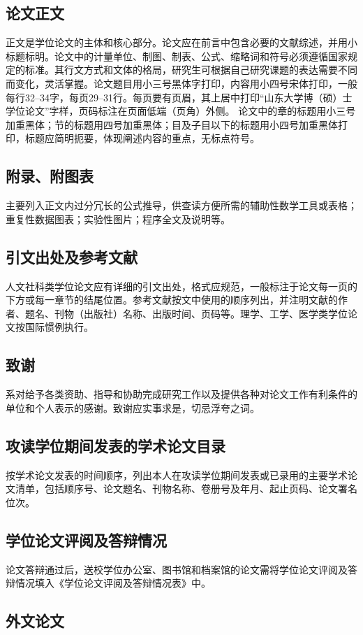\subsection{论文正文}
正文是学位论文的主体和核心部分。论文应在前言中包含必要的文献综述，并用小标题标明。论文中的计量单位、制图、制表、公式、缩略词和符号必须遵循国家规定的标准。其行文方式和文体的格局，研究生可根据自己研究课题的表达需要不同而变化，灵活掌握。论文题目用小三号黑体字打印，内容用小四号宋体打印，一般每行32--34字，每页29--31行。每页要有页眉，其上居中打印“山东大学博（硕）士学位论文”字样，页码标注在页面低端（页角）外侧。 论文中的章的标题用小三号加重黑体；节的标题用四号加重黑体；目及子目以下的标题用小四号加重黑体打印，标题应简明扼要，体现阐述内容的重点，无标点符号。
\subsection{附录、附图表}
主要列入正文内过分冗长的公式推导，供查读方便所需的辅助性数学工具或表格；重复性数据图表；实验性图片；程序全文及说明等。
\subsection{引文出处及参考文献}
人文社科类学位论文应有详细的引文出处，格式应规范，一般标注于论文每一页的下方或每一章节的结尾位置。参考文献按文中使用的顺序列出，并注明文献的作者、题名、刊物（出版社）名称、出版时间、页码等。理学、工学、医学类学位论文按国际惯例执行。
\subsection{致谢}
系对给予各类资助、指导和协助完成研究工作以及提供各种对论文工作有利条件的单位和个人表示的感谢。致谢应实事求是，切忌浮夸之词。
\subsection{攻读学位期间发表的学术论文目录}
按学术论文发表的时间顺序，列出本人在攻读学位期间发表或已录用的主要学术论文清单，包括顺序号、论文题名、刊物名称、卷册号及年月、起止页码、论文署名位次。
\subsection{学位论文评阅及答辩情况}
论文答辩通过后，送校学位办公室、图书馆和档案馆的论文需将学位论文评阅及答辩情况填入《学位论文评阅及答辩情况表》中。
\subsection{外文论文}

